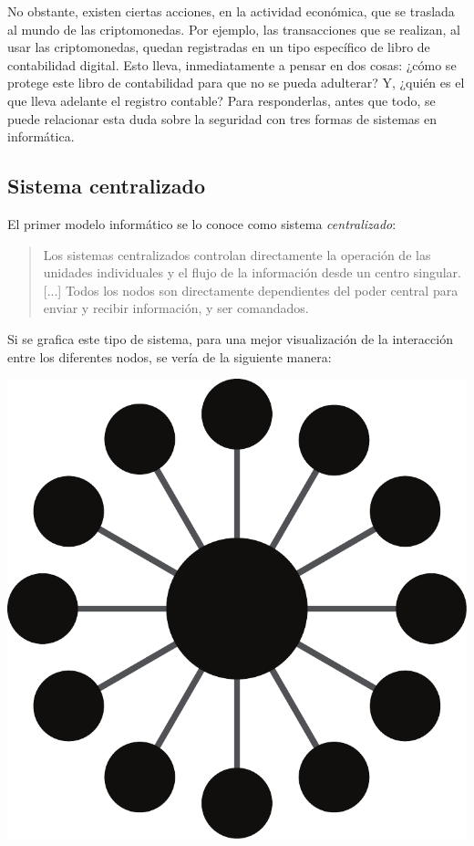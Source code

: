 \documentclass[12pt,a4paper,twoside]{book}
\begin{document}
No obstante, existen ciertas acciones, en la actividad económica, que se traslada al mundo de las criptomonedas. Por ejemplo, las transacciones que se realizan, al usar las criptomonedas, quedan registradas en un tipo específico de libro de contabilidad digital. Esto lleva, inmediatamente a pensar en dos cosas: ¿cómo se protege este libro de contabilidad para que no se pueda adulterar? Y, ¿quién es el que lleva adelante el registro contable? Para responderlas, antes que todo, se puede relacionar esta duda sobre la seguridad con tres formas de sistemas en informática.

\subsection{Sistema centralizado}
El primer modelo informático se lo conoce como sistema \textit{centralizado}:

\begin{quotation}
Los sistemas centralizados controlan directamente la operación de las unidades individuales y el flujo de la información desde un centro singular. [...] Todos los nodos son directamente dependientes del poder central para enviar y recibir información, y ser comandados. \cite{sist:cffn}
\end{quotation}

Si se grafica este tipo de sistema, para una mejor visualización de la interacción entre los diferentes nodos, se vería de la siguiente manera:

\begin{center}
\includegraphics[scale=0.25]{img/tiposist-central.pdf}
\end{center}
\end{document}
